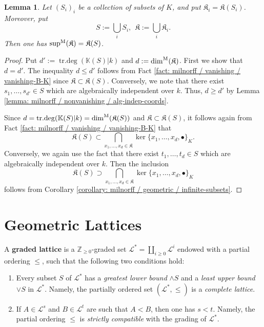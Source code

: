 \documentclass[11pt]{amsart}
\newtheorem{lemma}[proposition]{Lemma}
\theoremstyle{definition}
\theoremstyle{remark}
\numberwithin{equation}{section}
\DeclareMathOperator{\trdeg}{tr.deg}
\newcommand{\Z}{\mathbb{Z}}
\newcommand{\Kbb}{\mathbb{K}}
\newcommand{\Lcal}{\mathcal{L}}
\newcommand{\Kfrak}{\mathfrak{K}}
\newcommand{\dimm}{\dim^{\rm M}}
\newcommand{\msup}{{\sup}^{\rm M}}
\begin{document}
\begin{lemma}
\label{lemma: milnorff / milnordim / milnorsup}
  Let $(S_i)_i$ be a collection of subsets of $K$, and put $\Kfrak_i = \Kfrak(S_i)$.
  Moreover, put
  \[ S := \bigcup_i S_i, \ \ \Kfrak := \bigcup_i \Kfrak_i. \]
  Then one has $\msup(\Kfrak) = \Kfrak(S)$.
\end{lemma}
\begin{proof}
  Put $d' := \trdeg(\Kbb(S)|k)$ and $d := \dimm(\Kfrak)$.
  First we show that $d = d'$.
  The inequality $d \leq d'$ follows from Fact \ref{fact: milnorff / vanishing / vanishing-B-K} since $\Kfrak \subset \Kfrak(S)$.
  Conversely, we note that there exist $s_1,\ldots,s_{d'} \in S$ which are algebraically independent over $k$.
  Thus, $d \geq d'$ by Lemma \ref{lemma: milnorff / nonvanishing / alg-indep-coords}.

  Since $d = \trdeg(\Kbb(S)|k) = \dimm(\Kfrak(S))$ and $\Kfrak \subset \Kfrak(S)$, it follows again from Fact \ref{fact: milnorff / vanishing / vanishing-B-K} that
  \[ \Kfrak(S) \subset \bigcap_{x_1,\ldots,x_d \in \Kfrak} \ker\{x_1,\ldots,x_d,\bullet\}_K.\]
  Conversely, we again use the fact that there exist $t_1,\ldots,t_d \in S$ which are algebraically independent over $k$.
  Then the inclusion
  \[ \Kfrak(S) \supset \bigcap_{x_1,\ldots,x_d \in \Kfrak} \ker\{x_1,\ldots,x_d,\bullet\}_K\]
  follows from Corollary \ref{corollary: milnorff / geometric / infinite-subsets}.
\end{proof}



\section{Geometric Lattices}
\label{section: lattice}


A {\bf graded lattice} is a $\Z_{\geq 0}$-graded set $\Lcal^* = \coprod_{i \geq 0} \Lcal^i$ endowed with a partial ordering $\leq$, such that the following two conditions hold:
\begin{enumerate}
  \item Every subset $S$ of $\Lcal^*$ has a \emph{greatest lower bound} $\wedge S$ and a \emph{least upper bound} $\vee S$ in $\Lcal^*$. 
  Namely, the partially ordered set $(\Lcal^*,\leq)$ is a \emph{complete lattice}.
  \item If $A \in \Lcal^s$ and $B \in \Lcal^t$ are such that $A < B$, then one has $s < t$.
  Namely, the partial ordering $\leq$ is \emph{strictly compatible} with the grading of $\Lcal^*$.
\end{enumerate}
\end{document}

